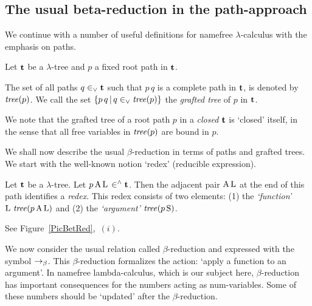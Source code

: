 \documentclass[submission,copyright,creativecommons]{eptcs}
\begin{document}
\subsection{The usual beta-reduction in the path-approach}\label{SecUsu}

We continue with a number of useful definitions for namefree $\lambda$-calculus with the emphasis on paths.

\begin{Def}\label{DefUsuGra}
Let ${\bf t}$ be a $\lambda$-tree and $p$ a fixed root path in ${\bf t}$.

The set of  all paths $q \in_{\vee} {\bf t}$ such that $p \, q$ is a complete path in ${\bf t}$, is denoted by ${\it tree}(p)$.
We call the set $\{p \, q \, | \, q \in_{\vee} {\it tree}(p)\}$ the {\em grafted tree\/} of $p$ in ${\bf t}$.
\end{Def}

We note that the grafted tree of a root path $p$ in a {\em closed\/} ${\bf t}$ is  `closed' itself, in the sense that all free variables in ${\it tree}(p)$ are bound in $p$.



We shall now describe the usual $\beta$-reduction in terms of paths and grafted trees. We start with the well-known notion `redex' (reducible expression).

\begin{Def}\label{DefUsuRed}

Let ${\bf t}$ be a $\lambda$-tree. Let $p \, {\rm A} \, {\rm L} \, \in^{\wedge} {\bf t}$. Then the adjacent pair ${\rm A} \, {\rm L}$ at the end of this path identifies a {\em redex\/}. This redex consists of two elements: (1) the {\em `function'\/} ${\rm L} \, \, {\it tree}(p \, {\rm A} \, {\rm L})$ and (2) the {\em `argument'\/} ${\it tree}(p \, {\rm S})$.
\end{Def}
See Figure~\ref{PicBetRed},~$(i)$.

\smallskip

We now consider the usual relation called $\beta$-reduction and expressed with the symbol $\rightarrow_{\beta}$. This $\beta$-reduction formalizes the action: `apply a function to an argument'. %
In namefree lambda-calculus, which is our subject here, $\beta$-reduction has important consequences for the numbers acting as num-variables. Some of these numbers should be `updated' after the $\beta$-reduction.

\end{document}
